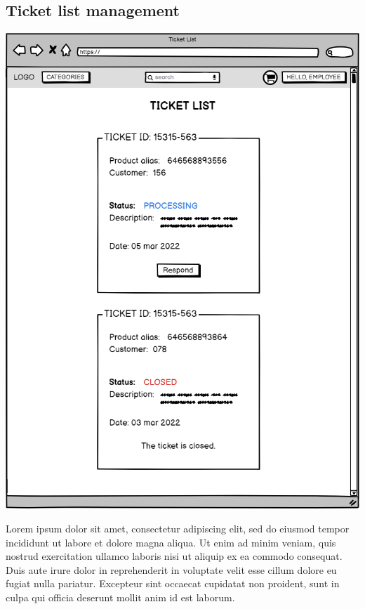 \subsection{Ticket list management}
    \includegraphics[width=\textwidth,height=\textheight,keepaspectratio]{mockups/ticketPageMockup.png}

    Lorem ipsum dolor sit amet, consectetur adipiscing elit, sed do eiusmod tempor incididunt ut labore et dolore magna aliqua. Ut enim ad minim veniam, quis nostrud exercitation ullamco laboris nisi ut aliquip ex ea commodo consequat. Duis aute irure dolor in reprehenderit in voluptate velit esse cillum dolore eu fugiat nulla pariatur. Excepteur sint occaecat cupidatat non proident, sunt in culpa qui officia deserunt mollit anim id est laborum.

